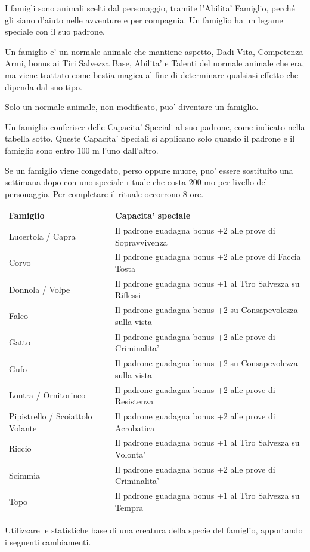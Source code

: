 \documentclass[a4paper,11pt,twoside,openany]{book}
\begin{document}
	I famigli sono animali scelti dal personaggio, tramite l'Abilita' Famiglio, perché gli siano d'aiuto nelle avventure e per compagnia. Un famiglio ha un legame speciale con il suo padrone.
	
	Un famiglio e' un normale animale che mantiene aspetto, Dadi Vita, Competenza Armi, bonus ai Tiri Salvezza Base, Abilita' e Talenti del normale animale che era, ma viene trattato come bestia magica al fine di determinare qualsiasi effetto che dipenda dal suo tipo. 
	
	Solo un normale animale, non modificato, puo' diventare un famiglio.
	
	Un famiglio conferisce delle Capacita' Speciali al suo padrone, come indicato nella tabella sotto. Queste Capacita' Speciali si applicano solo quando il padrone e il famiglio sono entro 100 m l'uno dall'altro.
	
	Se un famiglio viene congedato, perso oppure muore, puo' essere sostituito una settimana dopo con uno speciale rituale che costa 200 mo per livello del personaggio. Per {\small completare} il rituale occorrono 8 ore.
	
	\bigskip
	
	\begin{tabular}{L{4.5cm} L{11.5cm}}
		\toprule
		\textbf{Famiglio} & \textbf{Capacita' speciale}\tabularnewline
		Lucertola / Capra & Il padrone guadagna bonus +2 alle prove di Sopravvivenza\tabularnewline
		Corvo & Il padrone guadagna bonus +2 alle prove di Faccia Tosta\tabularnewline
		Donnola / Volpe & Il padrone guadagna bonus +1 al Tiro Salvezza su Riflessi\tabularnewline
		Falco & Il padrone guadagna bonus +2 su Consapevolezza sulla vista\tabularnewline
		Gatto & Il padrone guadagna bonus +2 alle prove di Criminalita'\tabularnewline
		Gufo & Il padrone guadagna bonus +2 su Consapevolezza sulla vista\tabularnewline
		Lontra / Ornitorinco & Il padrone guadagna bonus +2 alle prove di Resistenza\tabularnewline
		Pipistrello / Scoiattolo Volante & Il padrone guadagna bonus +2 alle prove di Acrobatica\tabularnewline
		Riccio & Il padrone guadagna bonus +1 al Tiro Salvezza su Volonta'\tabularnewline
		Scimmia & Il padrone guadagna bonus +2 alle prove di Criminalita'\tabularnewline
		Topo & Il padrone guadagna bonus +1 al Tiro Salvezza su Tempra\tabularnewline
	\end{tabular}
	
	\bigskip
	
	Utilizzare le statistiche base di una creatura della specie del famiglio, apportando i seguenti cambiamenti.
	
\end{document}
